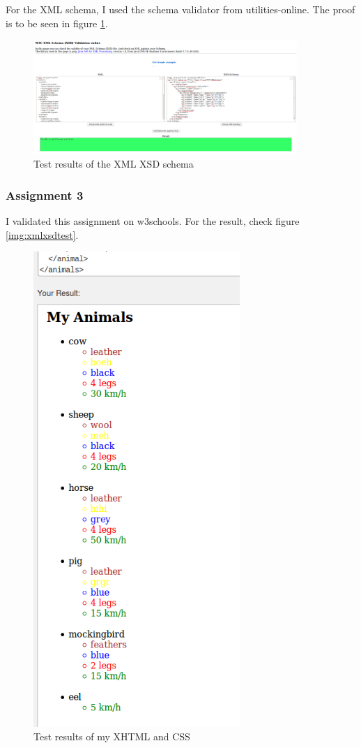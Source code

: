 For the XML schema, I used the schema validator from utilities-online. The proof is to be seen in figure \ref{fig:xmlxsdtest}.

\begin{figure}[h]
	\centering
	\includegraphics[width=100mm]{img/xmlxsdtest.png}
	\caption{Test results of the XML XSD schema}\label{fig:xmlxsdtest}
\end{figure}

\subsubsection{Assignment 3}
I validated this assignment on w3schools. For the result, check figure \ref{img:xmlxsdtest}.

\begin{figure}[h]
	\centering
	\includegraphics[height=180mm]{img/xhtml.png}
	\caption{Test results of my XHTML and CSS}\label{fig:xhtml}
\end{figure}

